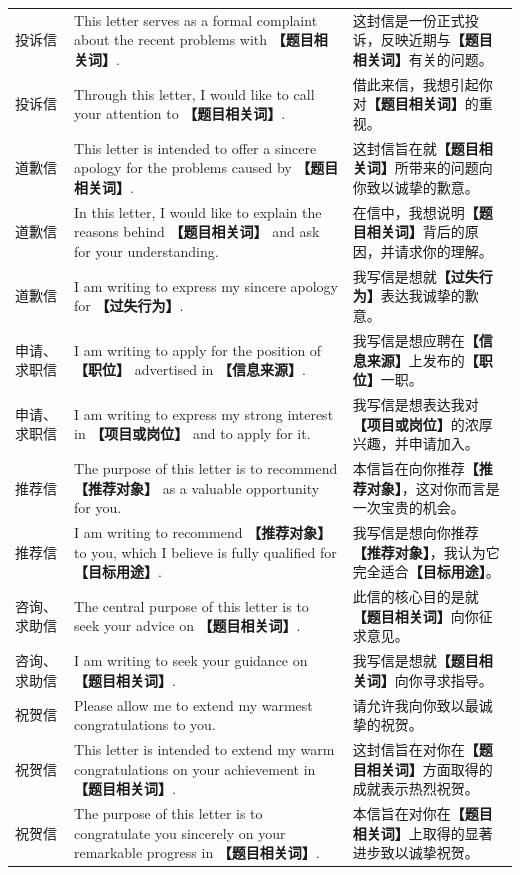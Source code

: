 \documentclass[11pt,a4paper]{ctexart}
\newcommand{\fillin}[1]{{\bfseries【#1】}}
\begin{document}
\begin{longtable}{L{2.0cm}L{9.2cm}L{4.6cm}}
投诉信 & This letter serves as a formal complaint about the recent problems with \fillin{题目相关词}. & 这封信是一份正式投诉，反映近期与\fillin{题目相关词}有关的问题。 \\
投诉信 & Through this letter, I would like to call your attention to \fillin{题目相关词}. & 借此来信，我想引起你对\fillin{题目相关词}的重视。 \\
\midrule

道歉信 & This letter is intended to offer a sincere apology for the problems caused by \fillin{题目相关词}. & 这封信旨在就\fillin{题目相关词}所带来的问题向你致以诚挚的歉意。 \\
道歉信 & In this letter, I would like to explain the reasons behind \fillin{题目相关词} and ask for your understanding. & 在信中，我想说明\fillin{题目相关词}背后的原因，并请求你的理解。 \\
道歉信 & I am writing to express my sincere apology for \fillin{过失行为}. & 我写信是想就\fillin{过失行为}表达我诚挚的歉意。 \\
\midrule

申请、求职信 & I am writing to apply for the position of \fillin{职位} advertised in \fillin{信息来源}. & 我写信是想应聘在\fillin{信息来源}上发布的\fillin{职位}一职。 \\
申请、求职信 & I am writing to express my strong interest in \fillin{项目或岗位} and to apply for it. & 我写信是想表达我对\fillin{项目或岗位}的浓厚兴趣，并申请加入。 \\
\midrule

推荐信 & The purpose of this letter is to recommend \fillin{推荐对象} as a valuable opportunity for you. & 本信旨在向你推荐\fillin{推荐对象}，这对你而言是一次宝贵的机会。 \\
推荐信 & I am writing to recommend \fillin{推荐对象} to you, which I believe is fully qualified for \fillin{目标用途}. & 我写信是想向你推荐\fillin{推荐对象}，我认为它完全适合\fillin{目标用途}。 \\
\midrule

咨询、求助信 & The central purpose of this letter is to seek your advice on \fillin{题目相关词}. & 此信的核心目的是就\fillin{题目相关词}向你征求意见。 \\
咨询、求助信 & I am writing to seek your guidance on \fillin{题目相关词}. & 我写信是想就\fillin{题目相关词}向你寻求指导。 \\
\midrule

祝贺信 & Please allow me to extend my warmest congratulations to you. & 请允许我向你致以最诚挚的祝贺。 \\
祝贺信 & This letter is intended to extend my warm congratulations on your achievement in \fillin{题目相关词}. & 这封信旨在对你在\fillin{题目相关词}方面取得的成就表示热烈祝贺。 \\
祝贺信 & The purpose of this letter is to congratulate you sincerely on your remarkable progress in \fillin{题目相关词}. & 本信旨在对你在\fillin{题目相关词}上取得的显著进步致以诚挚祝贺。 \\
\midrule


\end{longtable}
\end{document}
